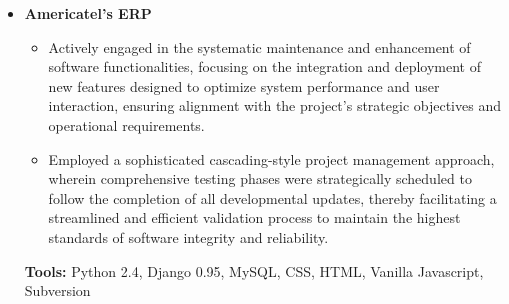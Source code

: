 \documentclass[11pt,a4paper,english]{moderncv}
\begin{document}
{\begin{itemize}
\begin{itemize}
            \item I actively engaged in the implementation of Extreme Programming (XP) practices, specifically focusing on Test-Driven Development (TDD) and Pair Programming, to enhance code quality and reliability through rigorous testing protocols and collaborative coding sessions, thereby significantly reducing bug rates and accelerating the feature development process.
            \item I was responsible for compiling all the technical documentation using Sphinx, meticulously documenting Python docstrings to create a comprehensive and navigable documentation repository that supports both current project needs and future maintenance efforts by providing clear, detailed explanations of code functionalities and APIs.
            \item Simultaneously developed the platforms Aptitus and Neoauto, which necessitated the creation of robust core libraries that were utilized across both projects to streamline development processes, reduce redundancy, and maintain a high standard of code efficiency and reusability.
        \end{itemize}
        \textbf{Tools:} Python 2.5, Django 1.x, OpenID, Memcached, South, MySQL, CSS, HTML, Vanilla Javascript, Subversion
    \item \textbf{Americatel's ERP}
        \begin{itemize}
            \item Actively engaged in the systematic maintenance and enhancement of software functionalities, focusing on the integration and deployment of new features designed to optimize system performance and user interaction, ensuring alignment with the project's strategic objectives and operational requirements.
            \item Employed a sophisticated cascading-style project management approach, wherein comprehensive testing phases were strategically scheduled to follow the completion of all developmental updates, thereby facilitating a streamlined and efficient validation process to maintain the highest standards of software integrity and reliability.
        \end{itemize}
        \textbf{Tools:} Python 2.4, Django 0.95, MySQL, CSS, HTML, Vanilla Javascript, Subversion
\end{itemize}
}

\subsection{}
\end{document}
